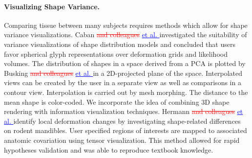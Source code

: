 \documentclass[journal]{style/vgtc} 			          %
\newcommand{\rem}[1]{\textcolor{red}{\sout{#1}}}
\newcommand{\add}[1]{\textcolor{blue}{\uline{#1}}}
\begin{document}
\paragraph{Visualizing Shape Variance.}
Comparing tissue between many subjects requires methods which allow for shape variance visualizations.
%
Caban \rem{and colleagues} \add{et al. \cite{Caban2011}} investigated the suitability of variance visualizations of shape distribution models and concluded that users favor spherical glyph representations over deformation grids and likelihood volumes.
%
The distribution of shapes in a space derived from a PCA is plotted by Busking \rem{and colleagues} \add{et al. \cite{Busking2010a}} in a 2D-projected plane of the space.
%
Interpolated views can be created by the user in a separate view as well as comparisons in a contour view.
%
Interpolation is carried out by mesh morphing.
%
The distance to the mean shape is color-coded.
%
We incorporate the idea of combining 3D shape rendering with information visualization techniques.
%
%
%
Hermann \rem{and colleagues} \add{et al. \cite{Hermann2014}} identify local deformation changes by investigating shape-related differences on rodent mandibles.
%
User specified regions of interests are mapped to associated anatomic covariation using tensor visualization.
%
This method allowed for rapid hypotheses validation and was able to reproduce textbook knowledge.
%
%
%
\end{document}
